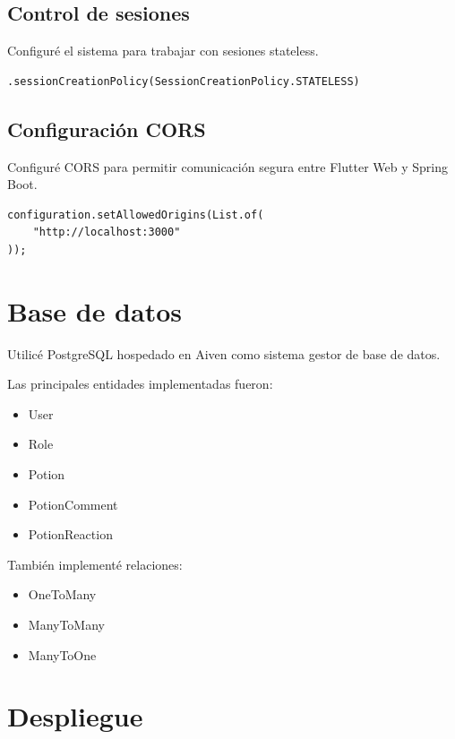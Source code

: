 \documentclass[12pt,a4paper]{article}
\begin{document}
\subsection{Control de sesiones}

Configuré el sistema para trabajar con sesiones stateless.

\begin{lstlisting}
.sessionCreationPolicy(SessionCreationPolicy.STATELESS)
\end{lstlisting}

\subsection{Configuración CORS}

Configuré CORS para permitir comunicación segura entre Flutter Web y Spring Boot.

\begin{lstlisting}
configuration.setAllowedOrigins(List.of(
    "http://localhost:3000"
));
\end{lstlisting}

\section{Base de datos}

Utilicé PostgreSQL hospedado en Aiven como sistema gestor de base de datos.

Las principales entidades implementadas fueron:

\begin{itemize}
    \item User
    \item Role
    \item Potion
    \item PotionComment
    \item PotionReaction
\end{itemize}

También implementé relaciones:

\begin{itemize}
    \item OneToMany
    \item ManyToMany
    \item ManyToOne
\end{itemize}

\section{Despliegue}
\end{document}
